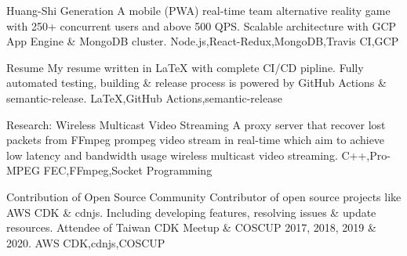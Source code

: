 \begin{projects}
  \project
  {Huang-Shi Generation}{}
  {}
  {A mobile (PWA) real-time team alternative reality game with 250+ concurrent users and above 500 QPS. Scalable architecture with GCP App Engine \& MongoDB cluster.}
  {Node.js,React-Redux,MongoDB,Travis CI,GCP}

  \project
  {Resume}{}
  {}
  {My resume written in LaTeX with complete CI/CD pipline. Fully automated testing, building \& release process is powered by GitHub Actions \& semantic-release.}
  {LaTeX,GitHub Actions,semantic-release}

  \project
  {Research: Wireless Multicast Video Streaming}{}
  {}
  {A proxy server that recover lost packets from FFmpeg prompeg video stream in real-time which aim to achieve low latency and bandwidth usage wireless multicast video streaming.}
  {C++,Pro-MPEG FEC,FFmpeg,Socket Programming}

  \project
  {Contribution of Open Source Community}{}
  {}
  {Contributor of open source projects like AWS CDK \& cdnjs. Including developing features, resolving issues \& update resources. Attendee of Taiwan CDK Meetup \& COSCUP 2017, 2018, 2019 \& 2020.}
  {AWS CDK,cdnjs,COSCUP}
\end{projects}
